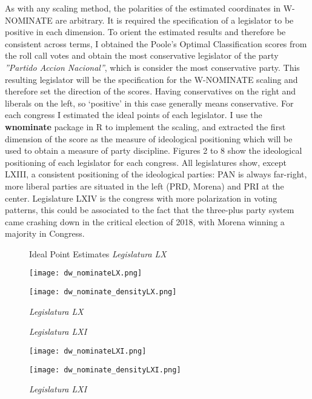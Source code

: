 \documentclass{article}
\begin{document}
As with any scaling method, the polarities of the estimated coordinates in W-NOMINATE are arbitrary. It is required the specification of a legislator to be positive in each dimension. To orient the estimated results and therefore be consistent across terms, I obtained the Poole’s Optimal Classification scores from the roll call votes and obtain the most conservative legislator of the party \textit{”Partido Accion Nacional”}, which is consider the most conservative party. This resulting legislator will be the specification for the W-NOMINATE scaling and therefore set the direction of the scores. Having conservatives on the right and liberals on the left, so ‘positive’ in this case generally means conservative. For each congress I estimated the ideal points of each legislator. I use the \textbf{wnominate} package in R to implement the scaling, and extracted the first dimension of the score as the measure of ideological positioning which will be used to obtain a measure of party discipline. Figures 2 to 8 show the ideological positioning of each legislator for each congress. All legislatures show, except LXIII, a consistent positioning of the ideological parties: PAN is always far-right,  more liberal parties are situated in the left (PRD, Morena) and PRI at the center. Legislature LXIV is the congress with more polarization in voting patterns, this could be associated to the fact that the three-plus party system came crashing down in the critical election of 2018, with Morena winning a  majority in Congress. 

\begin{figure}[!h]
	\centering
	\begin{minipage}{.5\textwidth}
		\centering
		\caption{Ideal Point Estimates \textit{Legislatura LX}}
		\texttt{[image: dw\_nominateLX.png]}
		\label{fig:test1}
	\end{minipage}%
	\begin{minipage}{.5\textwidth}
		\centering
		\caption{\textit{Legislatura LX}}
		\texttt{[image: dw\_nominate\_densityLX.png]}
		\label{fig:test2}
	\end{minipage}
\end{figure}

\begin{figure}[!h]
	\centering
	\begin{minipage}{.5\textwidth}
		\centering
		\caption{\textit{Legislatura LXI}}
		\texttt{[image: dw\_nominateLXI.png]}
		\label{fig:test1}
	\end{minipage}%
	\begin{minipage}{.5\textwidth}
		\centering
		\caption{\textit{Legislatura LXI}}
		\texttt{[image: dw\_nominate\_densityLXI.png]}
		\label{fig:test2}
	\end{minipage}
\end{figure} 
\end{document}
